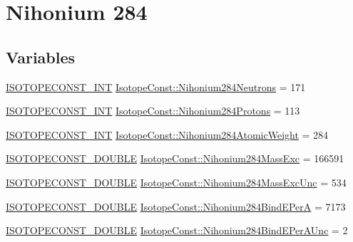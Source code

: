 \hypertarget{group___isotope_const-_nihonium-_nh284}{}\section{Nihonium 284}
\label{group___isotope_const-_nihonium-_nh284}
\subsection*{Variables}
\begin{DoxyCompactItemize}
\item 
\mbox{\hyperlink{group___isotope_const-_macros_ga5f18360b3e99483a35c32d789e62621c}{I\+S\+O\+T\+O\+P\+E\+C\+O\+N\+S\+T\+\_\+\+I\+NT}} \mbox{\hyperlink{group___isotope_const-_nihonium-_nh284_ga604d3bcd0b6c1f94a4cef7c3dc66bc76}{Isotope\+Const\+::\+Nihonium284\+Neutrons}} = 171
\item 
\mbox{\hyperlink{group___isotope_const-_macros_ga5f18360b3e99483a35c32d789e62621c}{I\+S\+O\+T\+O\+P\+E\+C\+O\+N\+S\+T\+\_\+\+I\+NT}} \mbox{\hyperlink{group___isotope_const-_nihonium-_nh284_ga48bcee0066870f64ebef200f40355a11}{Isotope\+Const\+::\+Nihonium284\+Protons}} = 113
\item 
\mbox{\hyperlink{group___isotope_const-_macros_ga5f18360b3e99483a35c32d789e62621c}{I\+S\+O\+T\+O\+P\+E\+C\+O\+N\+S\+T\+\_\+\+I\+NT}} \mbox{\hyperlink{group___isotope_const-_nihonium-_nh284_ga2a2fa0d6844486f48eb2f5d96a7bb65e}{Isotope\+Const\+::\+Nihonium284\+Atomic\+Weight}} = 284
\item 
\mbox{\hyperlink{group___isotope_const-_macros_ga8f45a7272ce02c0b4c65c44636ed719a}{I\+S\+O\+T\+O\+P\+E\+C\+O\+N\+S\+T\+\_\+\+D\+O\+U\+B\+LE}} \mbox{\hyperlink{group___isotope_const-_nihonium-_nh284_gaf9f8d5fb5c849b287ba1a722faac52f3}{Isotope\+Const\+::\+Nihonium284\+Mass\+Exc}} = 166591
\item 
\mbox{\hyperlink{group___isotope_const-_macros_ga8f45a7272ce02c0b4c65c44636ed719a}{I\+S\+O\+T\+O\+P\+E\+C\+O\+N\+S\+T\+\_\+\+D\+O\+U\+B\+LE}} \mbox{\hyperlink{group___isotope_const-_nihonium-_nh284_gaf1a60917e91b2ed1853e5067f99dc04b}{Isotope\+Const\+::\+Nihonium284\+Mass\+Exc\+Unc}} = 534
\item 
\mbox{\hyperlink{group___isotope_const-_macros_ga8f45a7272ce02c0b4c65c44636ed719a}{I\+S\+O\+T\+O\+P\+E\+C\+O\+N\+S\+T\+\_\+\+D\+O\+U\+B\+LE}} \mbox{\hyperlink{group___isotope_const-_nihonium-_nh284_gae7fe91e5334dd90344cccda4ca379f61}{Isotope\+Const\+::\+Nihonium284\+Bind\+E\+PerA}} = 7173
\item 
\mbox{\hyperlink{group___isotope_const-_macros_ga8f45a7272ce02c0b4c65c44636ed719a}{I\+S\+O\+T\+O\+P\+E\+C\+O\+N\+S\+T\+\_\+\+D\+O\+U\+B\+LE}} \mbox{\hyperlink{group___isotope_const-_nihonium-_nh284_ga47234ee263baa282e892dd53c89ac17d}{Isotope\+Const\+::\+Nihonium284\+Bind\+E\+Per\+A\+Unc}} = 2

\end{DoxyCompactItemize}
